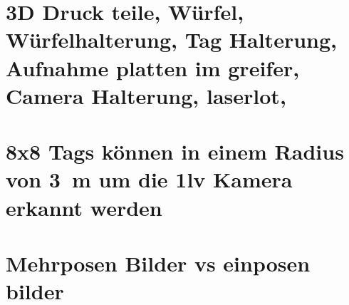 \section{3D Druck teile, Würfel, Würfelhalterung, Tag Halterung, Aufnahme platten im greifer, Camera Halterung, laserlot, }
\section{8x8 Tags können in einem Radius von \SI{3}{\metre} um die 1lv Kamera erkannt werden}
\section{Mehrposen Bilder vs einposen bilder}

%
%
%



